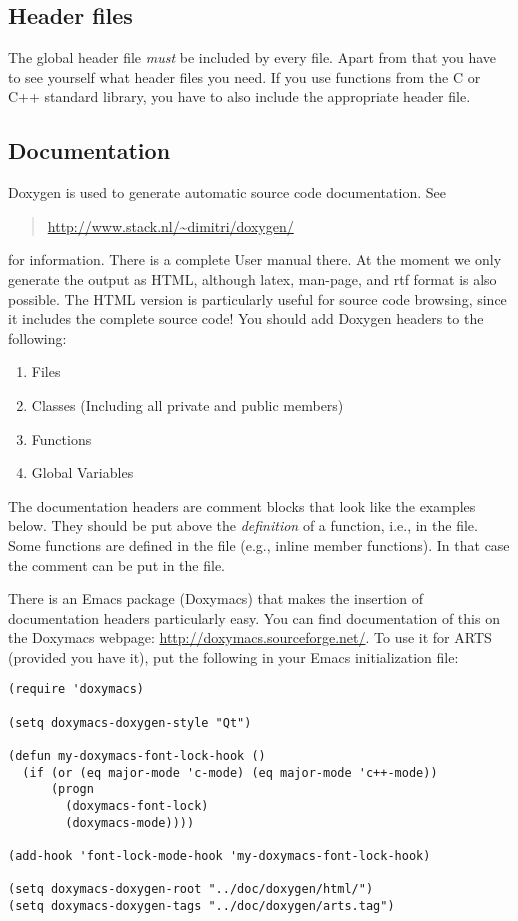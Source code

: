 \subsection{Header files} 
The global header file  \emph{must} be included by every
file. Apart from that you have to see yourself what header files you
need. If you use functions from the C or C++ standard library, you
have to also include the appropriate header file.

\subsection{Documentation}
Doxygen is used to generate automatic source code documentation. See
\begin{quote}
  \url{http://www.stack.nl/\~dimitri/doxygen/}
\end{quote}
for information. There is a complete User manual there. At the moment
we only generate the output as HTML, although latex, man-page, and rtf
format is also possible. The HTML version is particularly useful for
source code browsing, since it includes the complete source code! You
should add Doxygen headers to the following:

\begin{enumerate}
\item Files
\item Classes (Including all private and public members)
\item Functions
\item Global Variables
\end{enumerate}

The documentation headers are comment blocks that look like the
examples below. They should be put above the \emph{definition} of a
function, i.e., in the  file.  Some functions are defined in
the  file (e.g., inline member functions). In that case the
comment can be put in the  file.

There is an Emacs package (Doxymacs) that makes the insertion of
documentation headers particularly easy. You can find documentation of
this on the Doxymacs webpage: \url{http://doxymacs.sourceforge.net/}.
To use it for ARTS (provided you have it), put the following in your
Emacs initialization file:

\begin{verbatim}
(require 'doxymacs)

(setq doxymacs-doxygen-style "Qt")

(defun my-doxymacs-font-lock-hook ()
  (if (or (eq major-mode 'c-mode) (eq major-mode 'c++-mode))
      (progn
        (doxymacs-font-lock)
        (doxymacs-mode))))

(add-hook 'font-lock-mode-hook 'my-doxymacs-font-lock-hook)

(setq doxymacs-doxygen-root "../doc/doxygen/html/")
(setq doxymacs-doxygen-tags "../doc/doxygen/arts.tag")
\end{verbatim}

